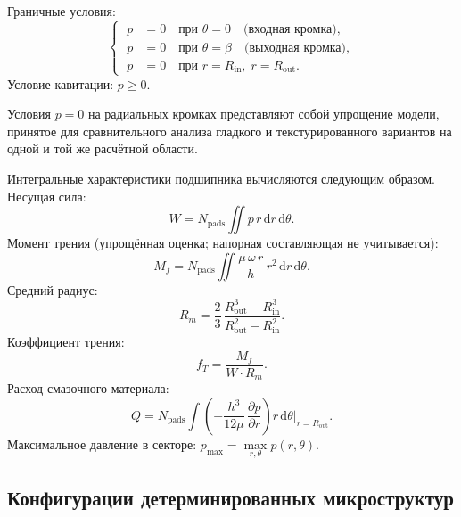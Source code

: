 Граничные условия:
\begin{equation}
\left\{\;
\begin{aligned}
  p &= 0 \quad \text{при } \theta = 0
    \quad \text{(входная кромка)}, \\
  p &= 0 \quad \text{при } \theta = \beta
    \quad \text{(выходная кромка)}, \\
  p &= 0 \quad \text{при } r = R_{\mathrm{in}},\;
    r = R_{\mathrm{out}}.
\end{aligned}
\right.
  \label{eq:thrust_bc}
\end{equation}
Условие кавитации: $p \geq 0$.

Условия $p = 0$ на радиальных кромках представляют собой упрощение
модели, принятое для сравнительного анализа гладкого
и текстурированного вариантов на одной и той же расчётной области.

Интегральные характеристики подшипника вычисляются следующим
образом. Несущая сила:
\begin{equation}
  W = N_{\mathrm{pads}} \iint p\, r\, \mathrm{d}r\, \mathrm{d}\theta.
  \label{eq:thrust_W}
\end{equation}
Момент трения (упрощённая оценка; напорная составляющая
не учитывается):
\begin{equation}
  M_f = N_{\mathrm{pads}} \iint
    \frac{\mu\, \omega\, r}{h}\, r^2\,
    \mathrm{d}r\, \mathrm{d}\theta.
  \label{eq:thrust_Mf}
\end{equation}
Средний радиус:
\begin{equation}
  R_m = \frac{2}{3}\,
    \frac{R_{\mathrm{out}}^3 - R_{\mathrm{in}}^3}
         {R_{\mathrm{out}}^2 - R_{\mathrm{in}}^2}.
  \label{eq:thrust_Rm}
\end{equation}
Коэффициент трения:
\begin{equation}
  f_T = \frac{M_f}{W \cdot R_m}.
  \label{eq:thrust_fT}
\end{equation}
Расход смазочного материала:
\begin{equation}
  Q = N_{\mathrm{pads}} \int
    \left(-\frac{h^3}{12\mu}\,
    \frac{\partial p}{\partial r}\right)
    r\, \mathrm{d}\theta
    \bigg|_{r = R_{\mathrm{out}}}.
  \label{eq:thrust_Q}
\end{equation}
Максимальное давление в секторе:
$p_{\max} = \max\limits_{r,\theta} p(r, \theta)$.


\subsection{Конфигурации детерминированных микроструктур}

